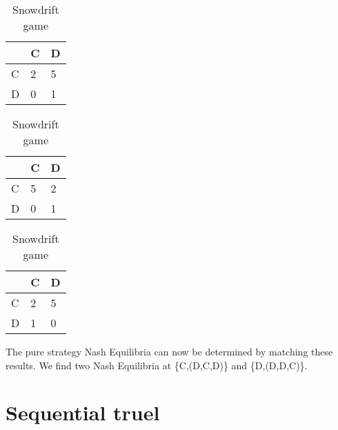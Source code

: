 \documentclass[a4paper, 11pt]{article}
\begin{document}
\begin{table}[!htb]
    \begin{minipage}{.33\linewidth}
      \caption{Prisonners dilemma}
      \label{table-PrisonnersDilemmaPayoffB}
      \centering
\begin{tabular}{l|l|l|}
\cline{2-3}
                        & C & D                         \\ \hline
\multicolumn{1}{|l|}{C} & 2 & \cellcolor[HTML]{9AFF99}5 \\ \hline
\multicolumn{1}{|l|}{D} & 0 & \cellcolor[HTML]{9AFF99}1 \\ \hline
\end{tabular}
    \end{minipage}%
    \begin{minipage}{.33\linewidth}
      \centering
      \caption{Stag-Hunt game}
      \label{table-Stag-HuntPayoffB}
\begin{tabular}{l|l|l|}
\cline{2-3}
                        & C                         & D                         \\ \hline
\multicolumn{1}{|l|}{C} & \cellcolor[HTML]{9AFF99}5 & 2                         \\ \hline
\multicolumn{1}{|l|}{D} & 0                         & \cellcolor[HTML]{9AFF99}1 \\ \hline
\end{tabular}
    \end{minipage} 
    \begin{minipage}{.33\linewidth}
      \centering
        \caption{Snowdrift game}
        \label{table-SnowdriftGamePayoffB}
\begin{tabular}{l|l|l|}
\cline{2-3}
                        & C                         & D                         \\ \hline
\multicolumn{1}{|l|}{C} & 2                         & \cellcolor[HTML]{9AFF99}5 \\ \hline
\multicolumn{1}{|l|}{D} & \cellcolor[HTML]{9AFF99}1 & 0                         \\ \hline
\end{tabular}
    \end{minipage} 
\end{table}


The pure strategy Nash Equilibria can now be determined by matching these results. We find two Nash Equilibria at \{C,(D,C,D)\} and \{D,(D,D,C)\}.



\section{Sequential truel}



\newpage



\end{document}
